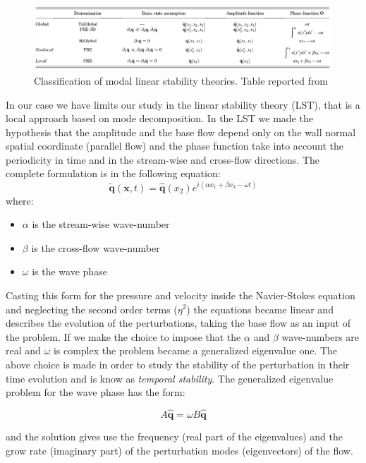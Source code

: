 \begin{figure}[h]
	\centering
	\includegraphics[width=1\linewidth]{chapter_1/table}
	\caption{Classification of modal linear stability theories. Table reported from \citet{juniper2014modal}}
	\label{fig:table}
\end{figure}
 
In our case we have limits our study in the linear stability theory (LST), that is a local approach based on mode decomposition.
In the LST we made the hypothesis that the amplitude and the base flow depend only on the wall normal spatial coordinate (parallel flow) and the phase function take into account the periodicity in time and in the stream-wise and cross-flow directions.
The complete formulation is in the following equation:
 $$  \widetilde{\mathbf{q}}(\mathbf{x},t) =  \widehat{\mathbf{q}}(x_2) e^{i(\alpha x_1 + \beta x_3 - \omega t)}  $$ 
where:
\begin{itemize}
	\item $\alpha$ is the stream-wise wave-number
	\item $\beta$ is the cross-flow wave-number
	\item $\omega$ is the wave phase
\end{itemize}

Casting this form for the pressure and velocity inside the Navier-Stokes equation and neglecting the second order terms ($\eta^2$) the equations became linear and  describes the evolution of the perturbations, taking the base flow as an input of the problem.
If we make the choice to impose that the $\alpha$ and $\beta$ wave-numbers are real and $\omega$ is complex the problem became a generalized eigenvalue one.
The above choice is made in order to study the stability of the perturbation in their time evolution and is know as \textit{temporal stability}.
The generalized eigenvalue problem for the wave phase has the form:

$$ A \widehat{\mathbf{q}} =  \omega B\widehat{\mathbf{q}} $$

and the solution gives use the frequency (real part of the eigenvalues) and the grow rate (imaginary part) of the perturbation modes (eigenvectors) of the flow.

